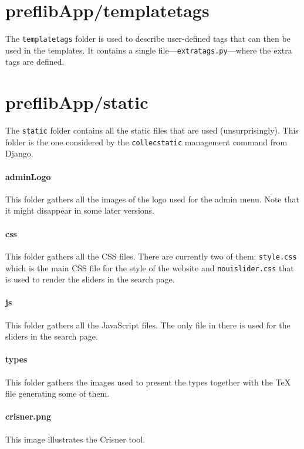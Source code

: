 \documentclass{report}
\begin{document}
	\section*{\faFolderO{} preflibApp/templatetags}
	
	The \texttt{templatetags} folder is used to describe user-defined tags that can then be used in the templates. It contains a single file---\texttt{extratags.py}---where the extra tags are defined.
	
	\section*{\faFolderO{} preflibApp/static}
	
	The \texttt{static} folder contains all the static files that are used (unsurprisingly). This folder is the one considered by the \texttt{collecstatic} management command from Django.
	
	\paragraph*{\faFolderO{} adminLogo} This folder gathers all the images of the logo used for the admin menu. Note that it might disappear in some later versions.
	
	\paragraph*{\faFolderO{} css} This folder gathers all the CSS files. There are currently two of them: \texttt{style.css} which is the main CSS file for the style of the website and \texttt{nouislider.css} that is used to render the sliders in the search page.
	
	\paragraph*{\faFolderO{} js} This folder gathers all the JavaScript files. The only file in there is used for the sliders in the search page.
	
	\paragraph*{\faFolderO{} types} This folder gathers the images used to present the types together with the TeX file generating some of them.
	
	\paragraph*{\faFileO{} crisner.png} This image illustrates the Crisner tool.
	
\end{document}
